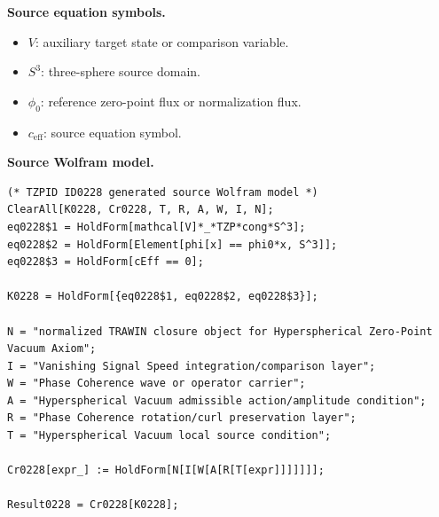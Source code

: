 \begin{minipage}[t]{0.49\linewidth}
\begingroup
\small
\raggedright
\textbf{Source equation symbols.}\par
\begin{itemize}[leftmargin=1.35em,itemsep=1pt,topsep=1pt,parsep=0pt]
    \item $V$: auxiliary target state or comparison variable.
    \item $S^3$: three-sphere source domain.
    \item $\phi_0$: reference zero-point flux or normalization flux.
    \item $c_{\mathrm{eff}}$: source equation symbol.
\end{itemize}
\endgroup
\end{minipage}\hfill
\begin{minipage}[t]{0.47\linewidth}
\begingroup
\scriptsize
\raggedright
\textbf{Source Wolfram model.}\par
\begin{Verbatim}[fontsize=\tiny,breaklines=true,breakanywhere=true]
(* TZPID ID0228 generated source Wolfram model *)
ClearAll[K0228, Cr0228, T, R, A, W, I, N];
eq0228$1 = HoldForm[mathcal[V]*_*TZP*cong*S^3];
eq0228$2 = HoldForm[Element[phi[x] == phi0*x, S^3]];
eq0228$3 = HoldForm[cEff == 0];

K0228 = HoldForm[{eq0228$1, eq0228$2, eq0228$3}];

N = "normalized TRAWIN closure object for Hyperspherical Zero-Point Vacuum Axiom";
I = "Vanishing Signal Speed integration/comparison layer";
W = "Phase Coherence wave or operator carrier";
A = "Hyperspherical Vacuum admissible action/amplitude condition";
R = "Phase Coherence rotation/curl preservation layer";
T = "Hyperspherical Vacuum local source condition";

Cr0228[expr_] := HoldForm[N[I[W[A[R[T[expr]]]]]]];

Result0228 = Cr0228[K0228];
\end{Verbatim}
\endgroup
\end{minipage}

